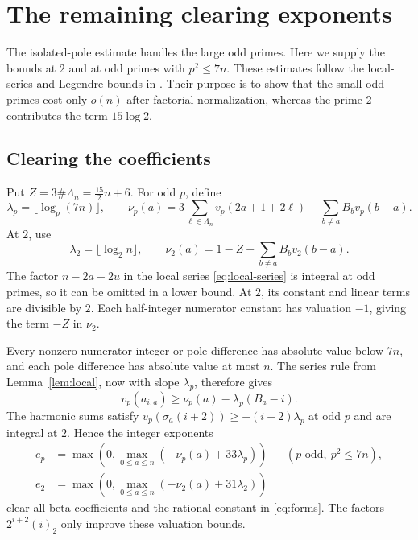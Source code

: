 \section{The remaining clearing exponents}\label{app:small}
The isolated-pole estimate handles the large odd primes. Here we
supply the bounds at $2$ and at odd primes with $p^2\le7n$.
These estimates follow the local-series and Legendre bounds in
\cite[Sections 4.1 and 4.5]{krisman}. Their purpose is to show that
the small odd primes cost only $o(n)$ after factorial normalization,
whereas the prime $2$ contributes the term $15\log2$.

\subsection{Clearing the coefficients}
Put $Z=3\#\Lambda_n=\tfrac{15}{2}n+6$. For odd $p$, define
\[
 \lambda_p=\lfloor\log_p(7n)\rfloor,\qquad
 \nu_p(a)=3\sum_{\ell\in\Lambda_n}v_p(2a+1+2\ell)
                         -\sum_{b\ne a}B_bv_p(b-a).
\]
At $2$, use
\[
 \lambda_2=\lfloor\log_2n\rfloor,\qquad
 \nu_2(a)=1-Z-\sum_{b\ne a}B_bv_2(b-a).
\]
The factor $n-2a+2u$ in the local series \eqref{eq:local-series}
is integral at odd primes, so it can be omitted in a lower bound.
At $2$, its constant and linear terms are divisible by $2$.
Each half-integer numerator constant has valuation $-1$, giving
the term $-Z$ in $\nu_2$.

Every nonzero numerator integer or pole difference has absolute value
below $7n$, and each pole difference has absolute value at most $n$.
The series rule from Lemma~\ref{lem:local}, now with slope
$\lambda_p$, therefore gives
\begin{equation}\label{eq:small-local}
 v_p(a_{i,a})\ge\nu_p(a)-\lambda_p(B_a-i).
\end{equation}
The harmonic sums satisfy
$v_p(\sigma_a(i+2))\ge-(i+2)\lambda_p$ at odd $p$ and are
integral at $2$. Hence the integer exponents
\begin{align}
 e_p&=\max\left(0,\max_{0\le a\le n}(-\nu_p(a)+33\lambda_p)\right)
                &&(p\text{ odd},\ p^2\le7n),                 \label{eq:small-ep}\\
 e_2&=\max\left(0,\max_{0\le a\le n}(-\nu_2(a)+31\lambda_2)\right)
                                                               \label{eq:two-ep}
\end{align}
clear all beta coefficients and the rational constant in
\eqref{eq:forms}. The factors $2^{i+2}(i)_2$ only improve these
valuation bounds.

